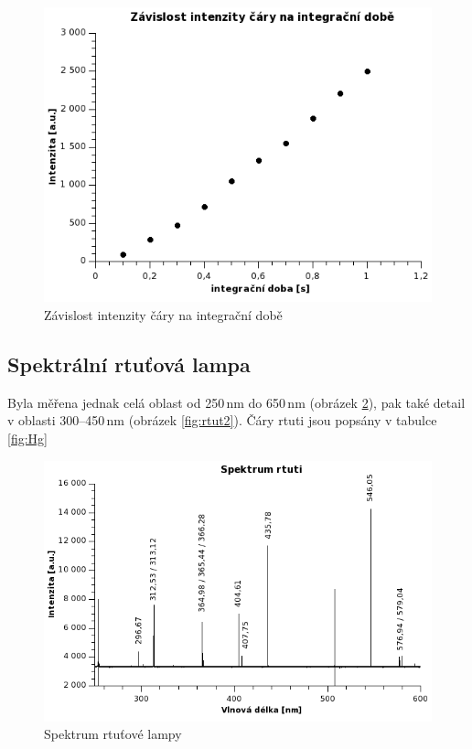 \documentclass[12pt]{article}
\begin{document}
\begin{figure}[h!]
  \centering
  \includegraphics[width=13cm]{img/Graph1.png}
  \caption{Závislost intenzity čáry na integrační době}
  \label{fig:ukol1} 
\end{figure}


\subsection{Spektrální rtuťová lampa}
Byla měřena jednak celá oblast od 250\,nm do 650\,nm (obrázek \ref{fig:rtut}), pak také detail v oblasti 300--450\,nm (obrázek \ref{fig:rtut2}). Čáry rtuti jsou popsány v tabulce \ref{fig:Hg}

\begin{figure}[h!]
  \centering
  \includegraphics[width=13cm]{img/rtut.png}
  \caption{Spektrum rtuťové lampy}
  \label{fig:rtut} 
\end{figure}
\end{document}
